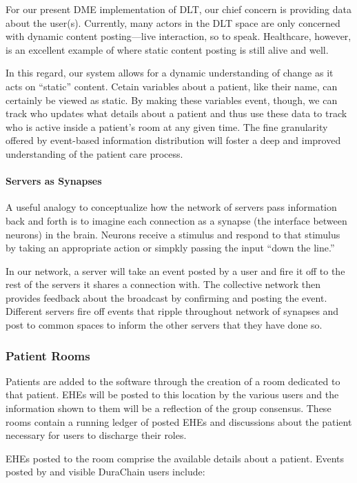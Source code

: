 \documentclass[letterpaper]{article}
\begin{document}
    For our present DME implementation of DLT, our chief concern is providing data about the user(s). Currently, many actors in the DLT space are only concerned with dynamic content posting---live interaction, so to speak. Healthcare, however, is an excellent example of where static content posting is still alive and well.%

    In this regard, our system allows for a dynamic understanding of change as it acts on ``static'' content. Cetain variables about a patient, like their name, can certainly be viewed as static. By making these variables event, though, we can track who updates what details about a patient and thus use these data to track who is active inside a patient's room at any given time. The fine granularity offered by event-based information distribution will foster a deep and improved understanding of the patient care process.%

    \paragraph{Servers as Synapses}
    A useful analogy to conceptualize how the network of servers pass information back and forth is to imagine each connection as a synapse (the interface between neurons) in the brain. Neurons receive a stimulus and respond to that stimulus by taking an appropriate action or simpkly passing the input ``down the line.''%

    In our network, a server will take an event posted by a user and fire it off to the rest of the servers it shares a connection with. The collective network then provides feedback about the broadcast by confirming and posting the event. Different servers fire off events that ripple throughout network of synapses and post to common spaces to inform the other servers that they have done so.%
  \subsubsection{Patient Rooms}
  Patients are added to the software through the creation of a room dedicated to that patient. EHEs will be posted to this location by the various users and the information shown to them will be a reflection of the group consensus. These rooms contain a running ledger of posted EHEs and discussions about the patient necessary for users to discharge their roles.%

  EHEs posted to the room comprise the available details about a patient. Events posted by and visible DuraChain users include:%
\end{document}
